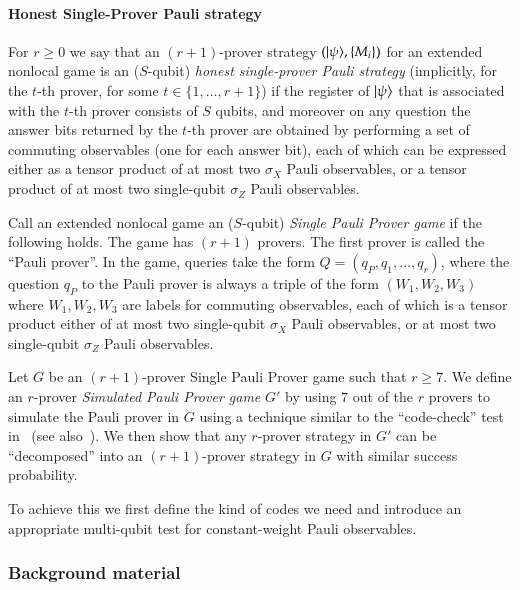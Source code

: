 \paragraph{Honest Single-Prover Pauli strategy} For $r\geq 0$ we say that an $(r+1)$-prover strategy $(|\psi\rangle,\{M_i\})$ for an extended nonlocal game is an ($S$-qubit) \emph{honest single-prover Pauli strategy} (implicitly, for the $t$-th prover, for some $t\in\{1,\ldots,r+1\}$) if the register of $|\psi\rangle$ that is associated with the $t$-th prover consists of $S$ qubits, and moreover on any question the answer bits returned by the $t$-th prover are obtained by performing a set of commuting observables (one for each answer bit), each of which can be expressed either as a tensor product of at most two $\sigma_X$ Pauli observables, or a tensor product of at most two single-qubit $\sigma_Z$ Pauli observables.



\begin{definition}
Call an extended nonlocal game an ($S$-qubit) \emph{Single Pauli Prover game} if the following holds. The game has $(r+1)$ provers. The first prover is called the ``Pauli prover''. In the game, queries take the form $Q=(q_P,q_1,\ldots,q_r)$, where the question $q_P$ to the Pauli prover is always a triple of the form $(W_1,W_2,W_3)$ where $W_1,W_2,W_3$ are labels for commuting  observables, each of which is a tensor product either of at most two single-qubit $\sigma_X$ Pauli observables, or at most two single-qubit $\sigma_Z$ Pauli observables. 
\end{definition}


Let $G$ be an $(r+1)$-prover Single Pauli Prover game such that $r\geq 7$. We define an $r$-prover \emph{Simulated Pauli Prover game} $G'$ by using $7$ out of the $r$ provers to simulate the Pauli prover in $G$ using a technique similar to the ``code-check'' test in~\cite{NV17} (see also~\cite{Ji}). We then show that any $r$-prover strategy in $G'$ can be ``decomposed'' into an $(r+1)$-prover strategy in $G$ with similar success probability. 

To achieve this we first define the kind of codes we need and introduce an appropriate multi-qubit test for constant-weight Pauli observables. 


\subsubsection{Background material}
\label{sec:codes}

